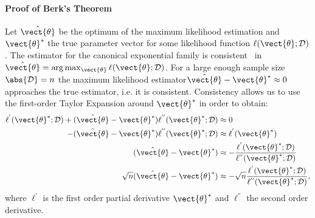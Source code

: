         \paragraph*{Proof of Berk's Theorem}
        Let $\hat{\vect{\theta}}$ be the optimum of the maximum likelihood estimation and $\vect{\theta}^*$ the true parameter vector for some likelihood function $\ell(\vect{\theta}; \mathcal{D})$.
        The estimator for the canonical exponential family is consistent~\cite{berk1972consistency}  in  $\hat{\vect{\theta}} = \arg\max_{\vect{\theta}} \ell(\vect{\theta}; \mathcal{D})$.
        For a large enough sample size $\abs{\mathcal{D}} = n$ the maximum likelihood estimator$\hat{\vect{\theta}} - \vect{\theta}^* \approx 0$  approaches the true estimator, i.e. it is consistent. 
        Consistency allows us to use the first-order Taylor Expansion around $\vect{\theta}^*$ in order to obtain:
        \begin{equation}
            \label{eq:ll_general}
            \begin{split}
                 \ell^{'}(\vect{\theta}^*; \mathcal{D}) +(\hat{\vect{\theta}} - \vect{\theta}^*) \ell^{''}(\vect{\theta}^*; \mathcal{D}) &\approx 0 \\
            - (\hat{\vect{\theta}} - \vect{\theta}^*) \ell^{''}(\vect{\theta}^*; \mathcal{D})&  \approx \ell^{'}(\vect{\theta}^*) \\
            (\hat{\vect{\theta}} - \vect{\theta}^*)  &\approx - \frac{ \ell^{'}(\vect{\theta}^*; \mathcal{D}) }{ \ell^{''}(\vect{\theta}^*; \mathcal{D})} \\
            \sqrt{n}(\hat{\vect{\theta}} - \vect{\theta}^*)  &\approx - \sqrt{n} \frac{ \ell^{'}(\vect{\theta}^*; \mathcal{D}) }{ \ell^{''}(\vect{\theta}^*; \mathcal{D})}, \\
            \end{split}
        \end{equation}
        where $\ell^{'}$ is the first order partial derivative \wrt $\vect{\theta}^*$ and $\ell^{''}$ the second order derivative.
